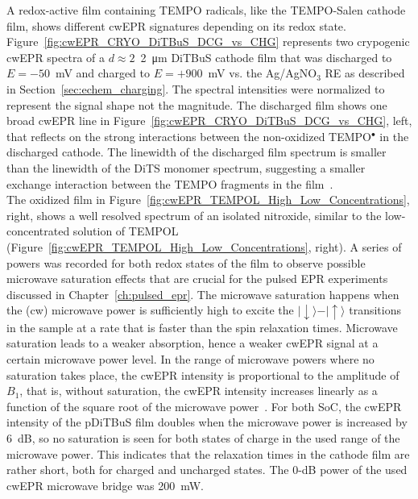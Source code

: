 A redox-active film containing TEMPO radicals, like the TEMPO-Salen cathode film, shows different cwEPR signatures depending on its redox state. Figure~\ref{fig:cwEPR_CRYO_DiTBuS_DCG_vs_CHG} represents two crypogenic cwEPR spectra of a $d\approx2$~\SI{2}{\micro\meter} DiTBuS cathode film that was discharged to $E=-50$~mV and charged to $E=+900$~mV vs. the Ag/AgNO$_3$ RE as described in Section~\ref{sec:echem_charging}. The spectral intensities were normalized to represent the signal shape not the magnitude. The discharged film shows one broad cwEPR line in Figure~\ref{fig:cwEPR_CRYO_DiTBuS_DCG_vs_CHG}, left, that reflects on the strong interactions between the non-oxidized TEMPO$^{\bullet}$ in the discharged cathode. The linewidth of the discharged film spectrum is smaller than the linewidth of the DiTS monomer spectrum, suggesting a smaller exchange interaction between the TEMPO fragments in the film~\cite{Vereshchagin2020}.\\
The oxidized film in Figure~\ref{fig:cwEPR_TEMPOL_High_Low_Concentrations}, right, shows a well resolved spectrum of an isolated nitroxide, similar to the low-concentrated solution of TEMPOL (Figure~\ref{fig:cwEPR_TEMPOL_High_Low_Concentrations}, right). A series of powers was recorded for both redox states of the film to observe possible microwave saturation effects that are crucial for the pulsed EPR experiments discussed in Chapter~\ref{ch:pulsed_epr}. The microwave saturation happens when the (cw) microwave power is sufficiently high to excite the $\vert{\downarrow}\rangle-\vert{\uparrow}\rangle$ transitions in the sample at a rate that is faster than the spin relaxation times. Microwave saturation leads to a weaker absorption, hence a weaker cwEPR signal at a certain microwave power level. In the range of microwave powers where no saturation takes place, the cwEPR intensity is proportional to the amplitude of $B_1$, that is, without saturation, the cwEPR intensity increases linearly as a function of the square root of the microwave power~\cite{Eaton_book}. For both SoC, the cwEPR intensity of the pDiTBuS film doubles when the microwave power is increased by 6~dB, so no saturation is seen for both states of charge in the used range of the microwave power. This indicates that the relaxation times in the cathode film are rather short, both for charged and uncharged states. The 0-dB power of the used cwEPR microwave bridge was 200~mW.
